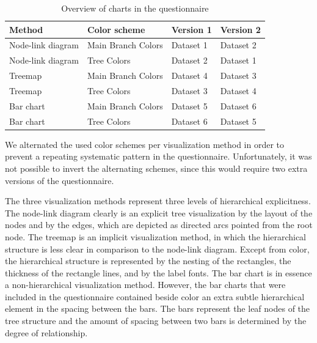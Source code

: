 \documentclass[journal]{vgtc}                %
\begin{document}
\begin{table}[!htb]
\begin{footnotesize}
\begin{center}
\begin{tabular}{llll}
\toprule
Method & Color scheme & Version 1 & Version 2\\
\midrule
Node-link diagram & Main Branch Colors & Dataset 1 & Dataset 2\\
Node-link diagram & Tree Colors & Dataset 2 & Dataset 1\\
Treemap & Main Branch Colors & Dataset 4 & Dataset 3\\
Treemap & Tree Colors & Dataset 3 & Dataset 4\\
Bar chart & Main Branch Colors & Dataset 5 & Dataset 6\\
Bar chart & Tree Colors & Dataset 6 & Dataset 5\\
\bottomrule
\end{tabular}
\end{center}
\end{footnotesize}
\caption{Overview of charts in the questionnaire}\label{table:ques}
\end{table}

We alternated the used color schemes per visualization method in order to prevent a repeating systematic pattern in the questionnaire. Unfortunately, it was not possible to invert the alternating schemes, since this would require two extra versions of the questionnaire. 

The three visualization methods represent three levels of hierarchical explicitness. The node-link diagram clearly is an explicit tree visualization by the layout of the nodes and by the edges, which are depicted as directed arcs pointed from the root node. The treemap is an implicit visualization method, in which the hierarchical structure is less clear in comparison to the node-link diagram. Except from color, the hierarchical structure is represented by the nesting of the rectangles, the thickness of the rectangle lines, and by the label fonts. The bar chart is in essence a non-hierarchical visualization method. However, the bar charts that were included in the questionnaire contained beside color an extra subtle hierarchical element in the spacing between the bars. The bars represent the leaf nodes of the tree structure and the amount of spacing between two bars is determined by the degree of relationship.
\end{document}
